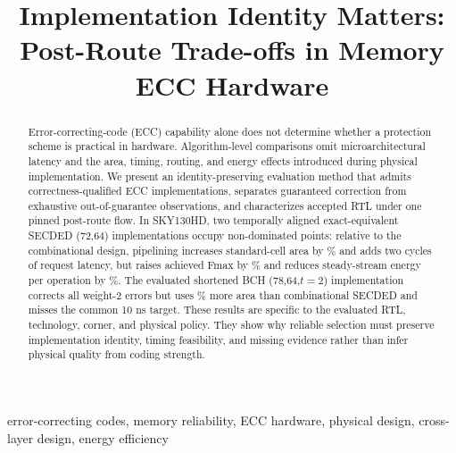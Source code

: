 \documentclass[conference,10pt]{IEEEtran}
\title{Implementation Identity Matters: Post-Route Trade-offs in Memory ECC Hardware}
\author{\IEEEauthorblockN{Anonymous submission}}
\begin{document}
\maketitle

\begin{abstract}
Error-correcting-code (ECC) capability alone does not determine whether a protection scheme is practical in hardware. Algorithm-level comparisons omit microarchitectural latency and the area, timing, routing, and energy effects introduced during physical implementation. We present an identity-preserving evaluation method that admits correctness-qualified ECC implementations, separates guaranteed correction from exhaustive out-of-guarantee observations, and characterizes accepted RTL under one pinned post-route flow. In SKY130HD, two temporally aligned exact-equivalent SECDED (72,64) implementations occupy non-dominated points: relative to the combinational design, pipelining increases standard-cell area by \SecAreaPct\% and adds two cycles of request latency, but raises achieved Fmax by \SecFmaxPct\% and reduces steady-stream energy per operation by \SecEnergyReductionPct\%. The evaluated shortened BCH (78,64,$t=2$) implementation corrects all weight-2 errors but uses \BchAreaPct\% more area than combinational SECDED and misses the common 10 ns target. These results are specific to the evaluated RTL, technology, corner, and physical policy. They show why reliable selection must preserve implementation identity, timing feasibility, and missing evidence rather than infer physical quality from coding strength.
\end{abstract}

\begin{IEEEkeywords}
error-correcting codes, memory reliability, ECC hardware, physical design, cross-layer design, energy efficiency
\end{IEEEkeywords}









\clearpage
\balance


\end{document}
